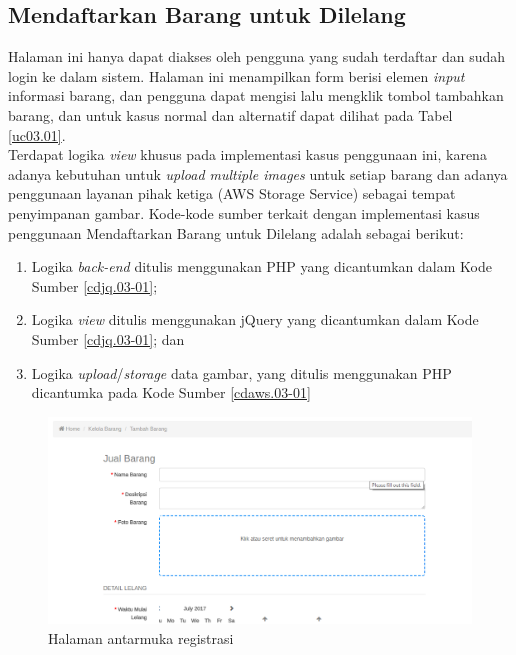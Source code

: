 \subsection{Mendaftarkan Barang untuk Dilelang}
\label{kasus-penggunaan-daftarbarang}
Halaman ini hanya dapat diakses oleh pengguna yang sudah terdaftar dan sudah login ke dalam sistem. Halaman ini menampilkan form berisi elemen \textit{input} informasi barang, dan pengguna dapat mengisi lalu mengklik tombol tambahkan barang, dan untuk kasus normal dan alternatif dapat dilihat pada Tabel \ref{uc03.01}.\\
\indent Terdapat logika \textit{view} khusus pada implementasi kasus penggunaan ini, karena adanya kebutuhan untuk \textit{upload multiple images} untuk setiap barang dan adanya penggunaan layanan pihak ketiga (AWS Storage Service) sebagai tempat penyimpanan gambar. Kode-kode sumber terkait dengan implementasi kasus penggunaan Mendaftarkan Barang untuk Dilelang adalah sebagai berikut:
	\begin{enumerate}
		\item Logika \textit{back-end} ditulis menggunakan PHP yang dicantumkan dalam Kode Sumber \ref{cdjq.03-01}; 
		\item Logika \textit{view} ditulis menggunakan jQuery yang dicantumkan dalam Kode Sumber \ref{cdjq.03-01}; dan
		\item Logika \textit{upload}/\textit{storage} data gambar, yang ditulis menggunakan PHP dicantumka pada Kode Sumber \ref{cdaws.03-01}
	\end{enumerate} 

  \begin{figure}[H]
    \centering
    \includegraphics[width=\textwidth]{images/bab4/ui/03-01.png}
    \caption{Halaman antarmuka registrasi}
    \label{ui.01-01}
  \end{figure}

